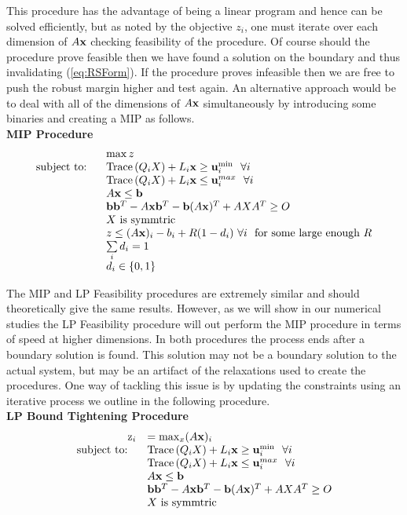 This procedure has the advantage of being a linear program and hence can be solved efficiently, but as noted by the objective $z_i$, one must iterate over each dimension of $A\mathbf{x}$ checking feasibility of the procedure. 
Of course should the procedure prove feasible then we have found a solution on the boundary and thus invalidating (\cref{eq:RSForm}). 
If the procedure proves infeasible then we are free to push the robust margin higher and test again. 
An alternative approach would be to deal with all of the dimensions of $A\mathbf{x}$ simultaneously by introducing some binaries and creating a MIP as follows. \\

\textbf{MIP Procedure}\
\begin{equation}\label{eq:OPTfeasrelaxLP2}
\begin{array}{rl}
 & \max z  \\
 \text{subject to: } \ &\operatorname{Trace}\left(Q_iX\right)+ L_i\mathbf{x} \geq \mathbf{u}_i^{\min}  \ \ \forall i\\
 & \operatorname{Trace}\left(Q_iX\right)+ L_i\mathbf{x} \leq \mathbf{u}_i^{max}  \ \ \forall i\\
 	&A\mathbf{x}\leq \mathbf{b} \\
 	&\mathbf{b}\mathbf{b}^T-A\mathbf{x}\mathbf{b}^T-\mathbf{b}(A\mathbf{x})^T+AXA^T\geq O \\
 	&X \text{ is symmtric} \\
 	& z\leq (A\mathbf{x})_i-b_i+R(1-d_i) \ \forall i \ \text{ for some large enough $R$} \\
 	& \sum\limits_i d_i=1 \\
 	& d_i\in\{0,1\}
\end{array}
\end{equation}


The MIP and LP Feasibility procedures are extremely similar and should theoretically give the same results. 
However, as we will show in our numerical studies the LP Feasibility procedure will out perform the MIP procedure in terms of speed at higher dimensions. 
In both procedures the process ends after a boundary solution is found. 
This solution may not be a boundary solution to the actual system, but may be an artifact of the relaxations used to create the procedures. 
One way of tackling this issue is by updating the constraints using an iterative process we outline in the following procedure.\\

\textbf{LP Bound Tightening Procedure}
\begin{equation}\label{eq:OPTfeasrelaxLP3}
\begin{array}{rl}
\mathrm{z}_{i} &  = \max_x (A\mathbf{x})_i  \\
 \text{subject to: } \ &\operatorname{Trace}\left(Q_iX\right)+ L_i\mathbf{x} \geq \mathbf{u}_i^{\min}  \ \ \forall i\\
 & \operatorname{Trace}\left(Q_iX\right)+ L_i\mathbf{x} \leq \mathbf{u}_i^{max}  \ \ \forall i\\
 	&A\mathbf{x}\leq \mathbf{b} \\
 	&\mathbf{b}\mathbf{b}^T-A\mathbf{x}\mathbf{b}^T-\mathbf{b}(A\mathbf{x})^T+AXA^T\geq O \\
 	&X \text{ is symmtric}
\end{array}
\end{equation}


